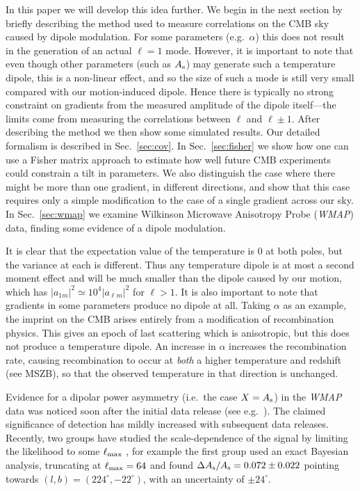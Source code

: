 \documentclass[twocolumn,aps,prd,showpacs]{revtex4}
\begin{document}
In this paper we will develop this idea further.
We begin in the next section by
briefly describing the method used to measure correlations
on the CMB sky caused by dipole modulation. For some parameters (e.g.\ $\alpha$)
this does not result in the generation of an actual
$\ell=1$ mode. However, it is important to note that even though 
other parameters (such as $A_{\rm s}$) may generate such a temperature dipole, 
this is 
a non-linear effect, and so the size of such a mode is still very small compared 
with our motion-induced dipole. Hence there is typically no strong
constraint on gradients from the measured amplitude of the dipole itself---the 
limits come from measuring the correlations between
$\ell$ and $\ell\pm1$.  After describing the method we then show some
simulated results.  Our detailed formalism is described in Sec.~\ref{sec:cov}.
In Sec.~\ref{sec:fisher} we
show how one can use a Fisher matrix approach to estimate how well future CMB
experiments could constrain a tilt in parameters.  We also distinguish the
case where there might be more than one gradient, in different directions, and show
that this case requires only a simple modification to the case of a single gradient 
across our sky.
In Sec.~\ref{sec:wmap} we examine Wilkinson Microwave Anisotropy Probe 
({\it WMAP\/}) data, finding some evidence of a dipole modulation.

It is clear that the expectation value 
of the temperature is $0$ at both poles, but the variance at each is 
different. Thus any temperature dipole is at most a second moment effect and
will be much smaller than the dipole caused by our
motion, which has $|a_{1m}|^2\simeq10^4 |a_{\ell m}|^2$ for $\ell>1$.
It is also important to note that gradients in some parameters produce no
dipole at all.  Taking $\alpha$ as an example,
the imprint on the CMB arises entirely from a 
modification of recombination physics.  This gives an epoch of last 
scattering which is anisotropic, but this does not produce a temperature
dipole.  An increase in $\alpha$ increases the recombination rate, causing
recombination to occur at \emph{both} a higher temperature and redshift
(see MSZB), so that the observed temperature in that direction is
unchanged.

Evidence for a dipolar power asymmetry (i.e.\ the case $X = A_{\rm s}$)
in the {\em WMAP\/} 
data was noticed soon after the initial data release (see 
e.g.~\cite{Eriksen:2003db,Prunet:2004zy}).  The claimed significance of
detection has mildly increased with subsequent data releases.
Recently, two groups have studied the scale-dependence of the signal by 
limiting the likelihood to some $\ell_{\rm max}$
\cite{Hoftuft:2009rq,Hanson:2009gu}, for example the first group used an
exact Bayesian analysis, truncating at $\ell_{\rm max} = 64$ and found
$\Delta A_{\rm s}/A_{\rm s} = 0.072 \pm 0.022$ 
pointing towards $(l,b)=(224^{\circ},-22^{\circ})$, with an uncertainty
of $\pm 24^{\circ}$. 
\end{document}
